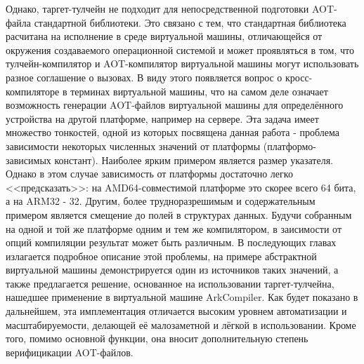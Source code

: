 \par
Однако, таргет-тулчейн не подходит для непосредственной подготовки AOT-файла стандартной библиотеки.
Это связано с тем, что стандартная библиотека расчитана на исполнение в среде виртуальной машины, отличающейся от окружения создаваемого операционной системой и может проявляться в том, что тулчейн-компилятор и AOT-компилятор виртуальной машины могут использовать разное соглашение о вызовах.
В виду этого появляется вопрос о кросс-компиляторе в терминах виртуальной машины, что на самом деле означает возможность генерации AOT-файлов виртуальной машины для определённого устройства на другой платформе, например на сервере. Эта задача имеет множество тонкостей, одной из которых посвящена данная работа - проблема зависимости некоторых численных значений от платформы (платформо-зависимых констант). Наиболее ярким примером является размер указателя. Однако в этом случае зависимость от платформы достаточно легко <<предсказать>>: на AMD64-совместимой платформе это скорее всего 64 бита, а на ARM32 - 32. Другим, более трудноразрешимым и содержательным примером является смещение до полей в структурах данных. Будучи собранным на одной и той же платформе одним и тем же компилятором, в заисимости от опций компиляции результат может быть различным. В последующих главах излагается подробное описание этой проблемы, на примере абстрактной виртуальной машины демонстрируется один из источников таких значений, а также предлагается решение, основанное на использовании таргет-тулчейна, нашедшее применение в виртуальной машине ArkCompiler. Как будет показано в дальнейшем, эта имплементация отличается высоким уровнем автоматизации и масштабируемости, делающей её малозаметной и лёгкой в использовании. Кроме того, помимо основной функции, она вносит дополнительную степень верифицикации AOT-файлов.

\newpage